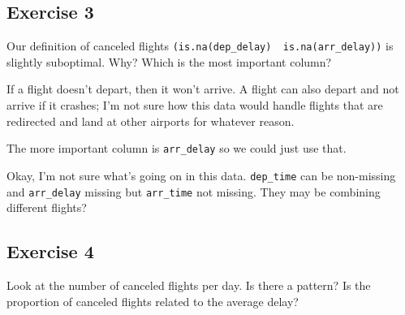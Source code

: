 \documentclass[]{book}
\newenvironment{Shaded}{\begin{snugshade}}{\end{snugshade}}
\newcommand{\CommentTok}[1]{\textcolor[rgb]{0.56,0.35,0.01}{\textit{#1}}}
\newcommand{\KeywordTok}[1]{\textcolor[rgb]{0.13,0.29,0.53}{\textbf{#1}}}
\newcommand{\NormalTok}[1]{#1}
\newcommand{\OperatorTok}[1]{\textcolor[rgb]{0.81,0.36,0.00}{\textbf{#1}}}
\newcommand{\StringTok}[1]{\textcolor[rgb]{0.31,0.60,0.02}{#1}}
\theoremstyle{definition}
\theoremstyle{definition}
\theoremstyle{definition}
\theoremstyle{remark}
\begin{document}
\hypertarget{exercise-3-5}{%
\subsection{Exercise 3}\label{exercise-3-5}}

Our definition of canceled flights
\texttt{(is.na(dep\_delay)\ \textbar{}\ is.na(arr\_delay))} is slightly
suboptimal. Why? Which is the most important column?

If a flight doesn't depart, then it won't arrive. A flight can also
depart and not arrive if it crashes; I'm not sure how this data would
handle flights that are redirected and land at other airports for
whatever reason.

The more important column is \texttt{arr\_delay} so we could just use
that.

\begin{Shaded}
\end{Shaded}

Okay, I'm not sure what's going on in this data. \texttt{dep\_time} can
be non-missing and \texttt{arr\_delay} missing but \texttt{arr\_time}
not missing. They may be combining different flights?

\hypertarget{exercise-4-4}{%
\subsection{Exercise 4}\label{exercise-4-4}}

Look at the number of canceled flights per day. Is there a pattern? Is
the proportion of canceled flights related to the average delay?
\end{document}
